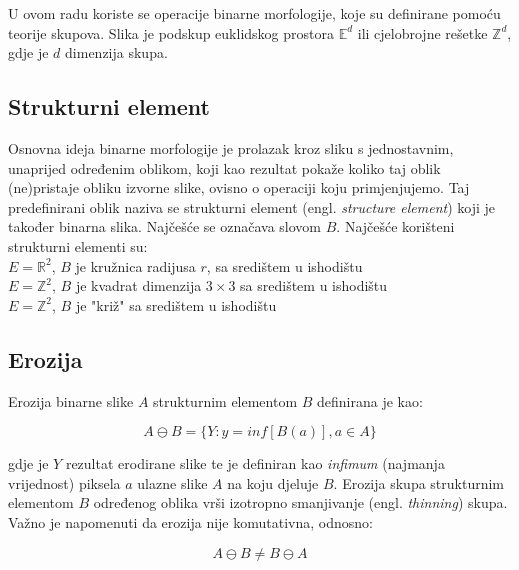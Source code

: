 \documentclass[times, zavrsni, numeric, utf8]{fer}
\begin{document}
U ovom radu koriste se operacije binarne morfologije, koje su definirane pomoću teorije skupova. Slika je podskup euklidskog prostora $\mathbb{E}^{d}$ ili cjelobrojne rešetke $\mathbb{Z}^{d}$, gdje je $d$ dimenzija skupa.
\subsection{Strukturni element}
\hspace*{0.5cm}Osnovna ideja binarne morfologije je prolazak kroz sliku s jednostavnim, unaprijed određenim oblikom, koji kao rezultat pokaže koliko taj oblik (ne)pristaje obliku izvorne slike, ovisno o operaciji koju primjenjujemo. Taj predefinirani oblik naziva se strukturni element (engl. \textit{structure element}) koji je također binarna slika. Najčešće se označava slovom $B$. Najčešće korišteni strukturni elementi su: \\
\hspace*{0.5cm}\textbullet{} $E = \mathbb{R}^{2}$, $B$ je kružnica radijusa $r$, sa središtem u ishodištu \\
\hspace*{0.5cm}\textbullet{} $E = \mathbb{Z}^{2}$, $B$ je kvadrat dimenzija $3 \times 3$ sa središtem u ishodištu \\
\hspace*{0.5cm}\textbullet{} $E = \mathbb{Z}^{2}$, $B$ je "križ" sa središtem u ishodištu

\subsection{Erozija}
\hspace*{0.5cm}Erozija binarne slike $A$ strukturnim elementom $B$ definirana je kao: 
\begin{center}
\begin{equation}
A \ominus B = \{Y:y = inf[B(a)], a \in A\}
\end{equation}
\end{center}
gdje je $Y$ rezultat erodirane slike te je definiran kao \textit{infimum} (najmanja vrijednost) piksela $a$ ulazne slike $A$ na koju djeluje $B$.
Erozija skupa strukturnim elementom $B$ određenog oblika vrši izotropno smanjivanje (engl. \textit{thinning}) skupa. Važno je napomenuti da erozija nije komutativna, odnosno:
\begin{center}
\begin{equation}
A \ominus B \neq B \ominus A
\end{equation}
\end{center}
\end{document}
